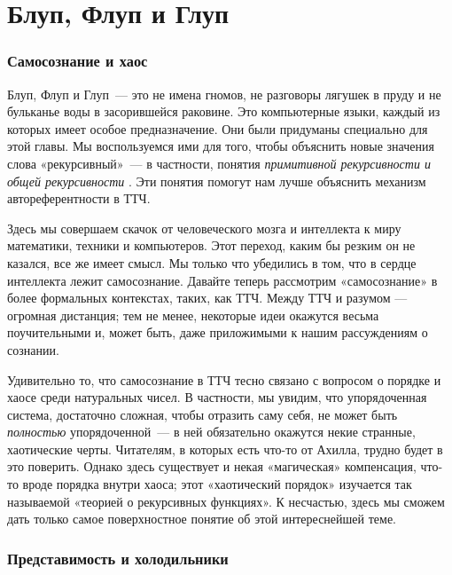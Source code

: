 \documentclass[../main.tex]{subfiles}
\begin{document}
\chapter{Блуп, Флуп и Глуп}

\subsection{Самосознание и хаос}

Блуп, Флуп и Глуп~--- это не имена гномов, не разговоры лягушек в пруду и не бульканье воды в засорившейся раковине. Это компьютерные языки, каждый из которых имеет особое предназначение. Они были придуманы специально для этой главы. Мы воспользуемся ими для того, чтобы объяснить новые значения слова «рекурсивный»~--- в частности, понятия \emph{примитивной рекурсивности и общей рекурсивности} . Эти понятия помогут нам лучше объяснить механизм автореферентности в ТТЧ.

Здесь мы совершаем скачок от человеческого мозга и интеллекта к миру математики, техники и компьютеров. Этот переход, каким бы резким он не казался, все же имеет смысл. Мы только что убедились в том, что в сердце интеллекта лежит самосознание. Давайте теперь рассмотрим «самосознание» в более формальных контекстах, таких, как ТТЧ. Между ТТЧ и разумом --- огромная дистанция; тем не менее, некоторые идеи окажутся весьма поучительными и, может быть, даже приложимыми к нашим рассуждениям о сознании.

Удивительно то, что самосознание в ТТЧ тесно связано с вопросом о порядке и хаосе среди натуральных чисел. В частности, мы увидим, что упорядоченная система, достаточно сложная, чтобы отразить саму себя, не может быть \emph{полностью} упорядоченной~--- в ней обязательно окажутся некие странные, хаотические черты. Читателям, в которых есть что-то от Ахилла, трудно будет в это поверить. Однако здесь существует и некая «магическая» компенсация, что-то вроде порядка внутри хаоса; этот «хаотический порядок» изучается так называемой «теорией о рекурсивных функциях». К несчастью, здесь мы сможем дать только самое поверхностное понятие об этой интереснейшей теме.


\subsection{Представимость и холодильники}
\end{document}
